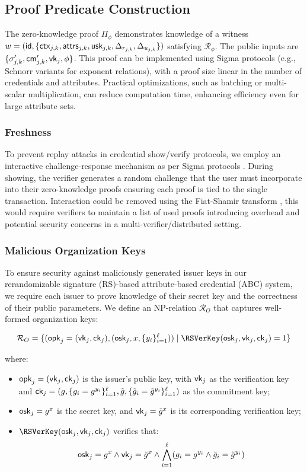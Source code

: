 \subsection{Proof Predicate Construction}

The zero-knowledge proof $\Pi_\phi$ demonstrates knowledge of a witness $w = (\mathsf{id}, \{\mathsf{ctx}_{j,k}, \mathsf{attrs}_{j,k}, \mathsf{usk}_{j,k}, \Delta_{r_{j,k}}, \Delta_{u_{j,k}}\})$ satisfying $\mathcal{R}_\phi$. The public inputs are $\{\sigma_{j,k}', \mathsf{cm}_{j,k}', \mathsf{vk}_j, \phi\}$. This proof can be implemented using Sigma protocols (e.g., Schnorr variants for exponent relations), with a proof size linear in the number of credentials and attributes. Practical optimizations, such as batching or multi-scalar multiplication, can reduce computation time, enhancing efficiency even for large attribute sets.

\subsubsection{Freshness}
To prevent replay attacks in credential show/verify protocols, we employ an interactive challenge-response mechanism as per Sigma protocols \cite{desmedt_proofs_1994, damgard_sigma_2010}. During showing, the verifier generates a random challenge that the user must incorporate into their zero-knowledge proofs ensuring each proof is tied to the single transaction. Interaction could be removed using the Fiat-Shamir transform \cite{odlyzko_how_1986}, this would require verifiers to maintain a list of used proofs introducing overhead and potential security concerns in a multi-verifier/distributed setting.


\subsubsection{Malicious Organization Keys}

To ensure security against maliciously generated issuer keys in our rerandomizable signature (RS)-based attribute-based credential (ABC) system, we require each issuer to prove knowledge of their secret key and the correctness of their public parameters. We define an NP-relation $\mathcal{R}_O$ that captures well-formed organization keys:

\[
\mathcal{R}_O = \{ (\opk_j = (\vk_j, \ck_j), (\osk_j, x, \{y_i\}_{i=1}^\ell)) \mid \RSVerKey(\osk_j, \vk_j, \ck_j) = 1 \}
\]

where:
\begin{itemize}
    \item $\mathsf{opk}_j = (\mathsf{vk}_j, \mathsf{ck}_j)$ is the issuer’s public key, with $\mathsf{vk}_j$ as the verification key and $\mathsf{ck}_j = (g, \{g_i = g^{y_i}\}_{i=1}^\ell, \tilde{g}, \{\tilde{g}_i = \tilde{g}^{y_i}\}_{i=1}^\ell)$ as the commitment key;
    \item $\mathsf{osk}_j = g^x$ is the secret key, and $\mathsf{vk}_j = \tilde{g}^x$ is its corresponding verification key;
    \item $\RSVerKey(\osk_j, \vk_j, \ck_j)$ verifies that:
    \[
    \mathsf{osk}_j = g^x \land \mathsf{vk}_j = \tilde{g}^x \land \bigwedge_{i=1}^\ell (g_i = g^{y_i} \land \tilde{g}_i = \tilde{g}^{y_i})
    \]
\end{itemize}

